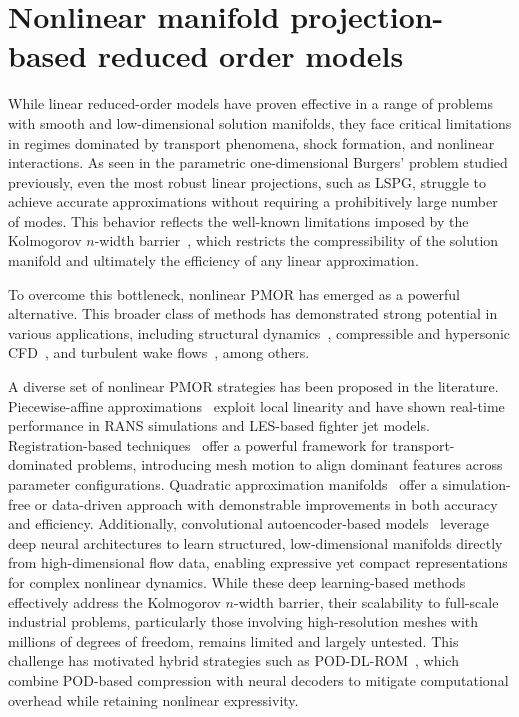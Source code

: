 \chapter{Nonlinear manifold projection-based reduced order models}
\label{chap:nonlinear_prom}

While linear reduced-order models have proven effective in a range of problems with smooth and low-dimensional solution manifolds, they face critical limitations in regimes dominated by transport phenomena, shock formation, and nonlinear interactions. As seen in the parametric one-dimensional Burgers' problem studied previously, even the most robust linear projections, such as LSPG, struggle to achieve accurate approximations without requiring a prohibitively large number of modes. This behavior reflects the well-known limitations imposed by the Kolmogorov $n$-width barrier~\cite{Quarteroni2014, pinkus2012n}, which restricts the compressibility of the solution manifold and ultimately the efficiency of any linear approximation.

To overcome this bottleneck, nonlinear PMOR has emerged as a powerful alternative. This broader class of methods has demonstrated strong potential in various applications, including structural dynamics~\cite{he2020situ}, compressible and hypersonic CFD~\cite{chmiel2025unified}, and turbulent wake flows~\cite{barnett2022quadratic}, among others.

A diverse set of nonlinear PMOR strategies has been proposed in the literature. Piecewise-affine approximations~\cite{amsallem2012nonlinear, grimberg2021mesh} exploit local linearity and have shown real-time performance in RANS simulations and LES-based fighter jet models. Registration-based techniques~\cite{taddei2020registration, mirhoseini2022model} offer a powerful framework for transport-dominated problems, introducing mesh motion to align dominant features across parameter configurations. Quadratic approximation manifolds~\cite{jain2017quadratic, barnett2022quadratic} offer a simulation-free or data-driven approach with demonstrable improvements in both accuracy and efficiency. Additionally, convolutional autoencoder-based models~\cite{lee2020model, romor2023non} leverage deep neural architectures to learn structured, low-dimensional manifolds directly from high-dimensional flow data, enabling expressive yet compact representations for complex nonlinear dynamics. While these deep learning-based methods effectively address the Kolmogorov $n$-width barrier, their scalability to full-scale industrial problems, particularly those involving high-resolution meshes with millions of degrees of freedom, remains limited and largely untested. This challenge has motivated hybrid strategies such as POD-DL-ROM~\cite{FRESCA2022114181}, which combine POD-based compression with neural decoders to mitigate computational overhead while retaining nonlinear expressivity.


